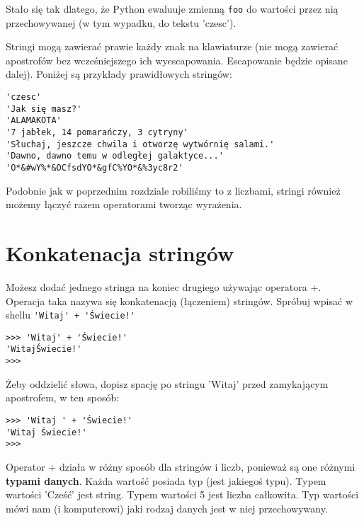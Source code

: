 \documentclass{book}
\begin{document}
Stało się tak dlatego, że Python ewaluuje zmienną \lstinline{foo} do wartości przez nią przechowywanej (w tym wypadku, do tekstu 'czesc').

Stringi mogą zawierać prawie każdy znak na klawiaturze (nie mogą zawierać apostrofów bez wcześniejszego ich wyescapowania. Escapowanie będzie opisane dalej). Poniżej są przykłady prawidłowych stringów:


\begin{lstlisting}
'czesc'
'Jak się masz?'
'ALAMAKOTA'
'7 jabłek, 14 pomarańczy, 3 cytryny'
'Słuchaj, jeszcze chwila i otworzę wytwórnię salami.'
'Dawno, dawno temu w odległej galaktyce...'
'O*&#wY%*&OCfsdYO*&gfC%YO*&%3yc8r2'
\end{lstlisting}

Podobnie jak w poprzednim rozdziale robiliśmy to z liczbami, stringi również możemy łączyć razem operatorami tworząc wyrażenia.

\section{Konkatenacja stringów}

Możesz dodać jednego stringa na koniec drugiego używając operatora +. Operacja taka nazywa się konkatenacją (łączeniem) stringów. Spróbuj wpisać w shellu \lstinline{'Witaj' + 'Świecie!'}

\begin{lstlisting}
>>> 'Witaj' + 'Świecie!'
'WitajŚwiecie!'
>>>
\end{lstlisting}

Żeby oddzielić słowa, dopisz spację po stringu 'Witaj' przed zamykającym apostrofem, w ten sposób:

\begin{lstlisting}
>>> 'Witaj ' + 'Świecie!'
'Witaj Świecie!'
>>> 
\end{lstlisting}

Operator + działa w różny sposób dla stringów i liczb, ponieważ są one różnymi {\bf typami danych}. Każda wartość posiada typ (jest jakiegoś typu). Typem wartości 'Cześć' jest string. Typem wartości 5 jest liczba całkowita. Typ wartości mówi nam (i komputerowi) jaki rodzaj danych jest w niej przechowywany. 
\end{document}
